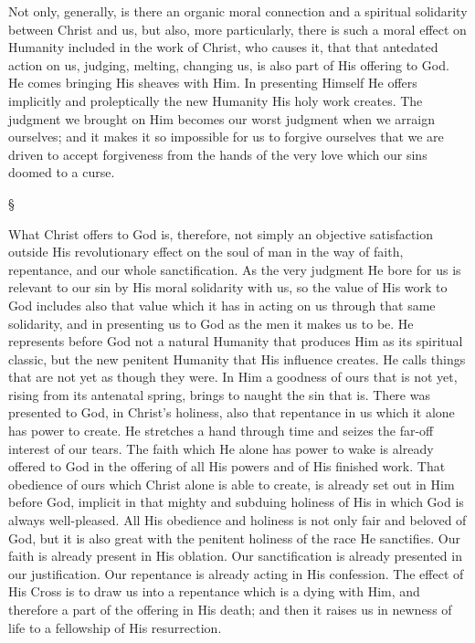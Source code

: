 \documentclass[12pt,a5paper,twoside,titlepage]{book}
\begin{document}
Not only, generally, is there an organic moral 
connection and a spiritual solidarity between 
Christ and us, but also, more particularly, there 
is such a moral effect on Humanity included in 
the work of Christ, who causes it, that that antedated 
action on us, judging, melting, changing 
us, is also part of His offering to God. He comes 
bringing His sheaves with Him. In presenting 
Himself He offers implicitly and proleptically 
the new Humanity His holy work creates. The 
judgment we brought on Him becomes our 
worst judgment when we arraign ourselves; 
and it makes it so impossible for us to forgive 
ourselves that we are driven to accept forgiveness 
from the hands of the very love which 
our sins doomed to a curse. 

\begin{center}
\S
\end{center}

What Christ offers to God is, therefore, not 
simply an objective satisfaction outside His 
revolutionary effect on the soul of man in the 
way of faith, repentance, and our whole sanctification. 
As the very judgment He bore for 
us is relevant to our sin by His moral solidarity 
with us, so the value of His work to God includes 
also that value which it has in acting 
on us through that same solidarity, and in presenting 
us to God as the men it makes us to be. 
He represents before God not a natural Humanity 
that produces Him as its spiritual classic, but 
the new penitent Humanity that His influence 
creates. He calls things that are not yet as 
though they were. In Him a goodness of ours 
that is not yet, rising from its antenatal spring, 
brings to naught the sin that is. There was 
presented to God, in Christ's holiness, also that 
repentance in us which it alone has power to 
create. He stretches a hand through time and 
seizes the far-off interest of our tears. The 
faith which He alone has power to wake is 
already offered to God in the offering of 
all His powers and of His finished work. 
That obedience of ours which Christ alone 
is able to create, is already set out in Him 
before God, implicit in that mighty and subduing 
holiness of His in which God is always 
well-pleased. All His obedience and holiness 
is not only fair and beloved of God, but it is 
also great with the penitent holiness of the race 
He sanctifies. Our faith is already present in His 
oblation. Our sanctification is already presented 
in our justification. Our repentance is already 
acting in His confession. The effect of His 
Cross is to draw us into a repentance which 
is a dying with Him, and therefore a part of 
the offering in His death; and then it raises 
us in newness of life to a fellowship of His 
resurrection. 
\end{document}
